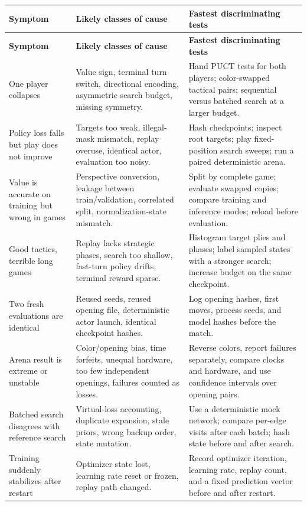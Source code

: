 \documentclass[10.5pt,letterpaper]{article}
\begin{document}
\small
\begin{longtable}{L{0.25\textwidth} L{0.34\textwidth} L{0.33\textwidth}}
\toprule
\sffamily\bfseries Symptom &
\sffamily\bfseries Likely classes of cause &
\sffamily\bfseries Fastest discriminating tests \\
\midrule
\endfirsthead
\toprule
\sffamily\bfseries Symptom &
\sffamily\bfseries Likely classes of cause &
\sffamily\bfseries Fastest discriminating tests \\
\midrule
\endhead
One player collapses &
Value sign, terminal turn switch, directional encoding, asymmetric search
budget, missing symmetry. &
Hand PUCT tests for both players; color-swapped tactical pairs; sequential
versus batched search at a larger budget. \\
\addlinespace
Policy loss falls but play does not improve &
Targets too weak, illegal-mask mismatch, replay overuse, identical actor,
evaluation too noisy. &
Hash checkpoints; inspect root targets; play fixed-position search sweeps; run a
paired deterministic arena. \\
\addlinespace
Value is accurate on training but wrong in games &
Perspective conversion, leakage between train/validation, correlated split,
normalization-state mismatch. &
Split by complete game; evaluate swapped copies; compare training and inference
modes; reload before evaluation. \\
\addlinespace
Good tactics, terrible long games &
Replay lacks strategic phases, search too shallow, fast-turn policy drifts,
terminal reward sparse. &
Histogram target plies and phases; label sampled states with a stronger search;
increase budget on the same checkpoint. \\
\addlinespace
Two fresh evaluations are identical &
Reused seeds, reused opening file, deterministic actor launch, identical
checkpoint hashes. &
Log opening hashes, first moves, process seeds, and model hashes before the
match. \\
\addlinespace
Arena result is extreme or unstable &
Color/opening bias, time forfeits, unequal hardware, too few independent
openings, failures counted as losses. &
Reverse colors, report failures separately, compare clocks and hardware, and
use confidence intervals over opening pairs. \\
\addlinespace
Batched search disagrees with reference search &
Virtual-loss accounting, duplicate expansion, stale priors, wrong backup order,
state mutation. &
Use a deterministic mock network; compare per-edge visits after each batch;
hash state before and after search. \\
\addlinespace
Training suddenly stabilizes after restart &
Optimizer state lost, learning rate reset or frozen, replay path changed. &
Record optimizer iteration, learning rate, replay count, and a fixed prediction
vector before and after restart. \\
\bottomrule
\end{longtable}
\normalsize
\end{document}
